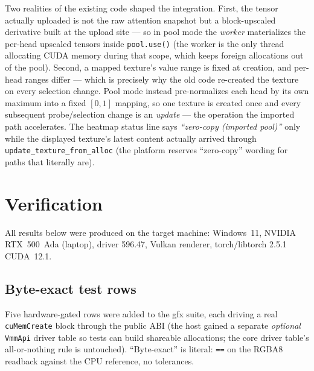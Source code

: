 \documentclass[11pt]{article}
\begin{document}
Two realities of the existing code shaped the integration. First, the tensor
actually uploaded is not the raw attention snapshot but a block-upscaled
derivative built at the upload site --- so in pool mode the \emph{worker}
materializes the per-head upscaled tensors inside \texttt{pool.use()} (the
worker is the only thread allocating CUDA memory during that scope, which
keeps foreign allocations out of the pool). Second, a mapped texture's
value range is fixed at creation, and per-head ranges differ --- which is
precisely why the old code re-created the texture on every selection change.
Pool mode instead pre-normalizes each head by its own maximum into a fixed
$[0,1]$ mapping, so one texture is created once and every subsequent
probe/selection change is an \emph{update} --- the operation the imported
path accelerates. The heatmap status line says
\emph{``zero-copy (imported pool)''} only while the displayed texture's
latest content actually arrived through \texttt{update\_texture\_from\_alloc}
(the platform reserves ``zero-copy'' wording for paths that literally are).

\section{Verification}

All results below were produced on the target machine: Windows~11, NVIDIA
RTX~500~Ada (laptop), driver 596.47, Vulkan renderer, torch/libtorch 2.5.1
CUDA~12.1.

\subsection{Byte-exact test rows}
Five hardware-gated rows were added to the gfx suite, each driving a real
\texttt{cuMemCreate} block through the public ABI (the host gained a separate
\emph{optional} \texttt{VmmApi} driver table so tests can build shareable
allocations; the core driver table's all-or-nothing rule is untouched).
``Byte-exact'' is literal: \texttt{==} on the RGBA8 readback against the CPU
reference, no tolerances.
\end{document}

